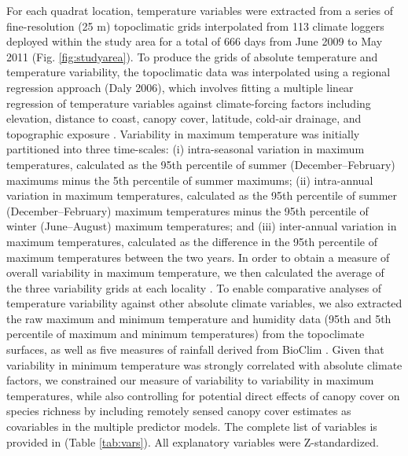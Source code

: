 For each quadrat location, temperature variables were extracted from a series of fine-resolution (25 m) topoclimatic grids interpolated from 113 climate loggers deployed within the study area for a total of 666 days from June 2009 to May 2011 (Fig. \ref{fig:studyarea}). To produce the grids of absolute temperature and temperature variability, the topoclimatic data was interpolated using a regional regression approach (Daly 2006), which involves fitting a multiple linear regression of temperature variables against climate-forcing factors including elevation, distance to coast, canopy cover, latitude, cold-air drainage, and topographic exposure \citep[see][for full details]{Ashcroft2011}. Variability in maximum temperature was initially partitioned into three time-scales: (i) intra-seasonal variation in maximum temperatures, calculated as the 95th percentile of summer (December--February) maximums minus the 5th percentile of summer maximums; (ii) intra-annual variation in maximum temperatures, calculated as the 95th percentile of summer (December--February) maximum temperatures minus the 95th percentile of winter (June--August) maximum temperatures; and (iii) inter-annual variation in maximum temperatures, calculated as the difference in the 95th percentile of maximum temperatures between the two years. In order to obtain a measure of overall variability in maximum temperature, we then calculated the average of the three variability grids at each locality \citep{Ashcroft2011, Ashcroft2012b}. To enable comparative analyses of temperature variability against other absolute climate variables, we also extracted the raw maximum and minimum temperature and humidity data (95th and 5th percentile of maximum and minimum temperatures) from the topoclimate surfaces, as well as five measures of rainfall derived from BioClim \citep{HoulderDHutchinsonMNixH2003}. Given that variability in minimum temperature was strongly correlated with absolute climate factors, we constrained our measure of variability to variability in maximum temperatures, while also controlling for potential direct effects of canopy cover on species richness by including remotely sensed canopy cover estimates \citep{DECC2008} as covariables in the multiple predictor models. The complete list of variables is provided in (Table \ref{tab:vars}). All explanatory variables were Z-standardized. 


